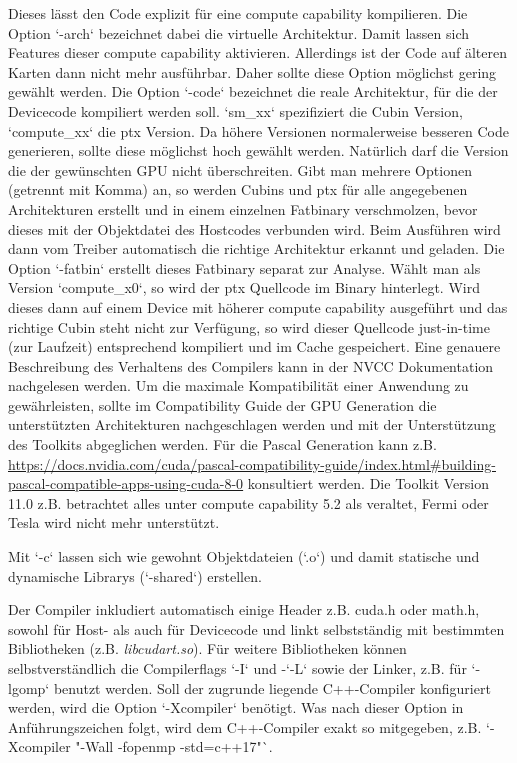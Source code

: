 			Dieses lässt den Code explizit für eine \gls{compute capability} kompilieren. Die Option \li`-arch` bezeichnet dabei die virtuelle Architektur. Damit lassen sich Features dieser \gls{compute capability} aktivieren. Allerdings ist der Code auf älteren Karten dann nicht mehr ausführbar. Daher sollte diese Option möglichst gering gewählt werden. Die Option \li`-code` bezeichnet die reale Architektur, für die der Devicecode kompiliert werden soll. \li`sm_xx` spezifiziert die Cubin Version, \li`compute_xx` die ptx Version. Da höhere Versionen normalerweise besseren Code generieren, sollte diese möglichst hoch gewählt werden. Natürlich darf die Version die der gewünschten GPU nicht überschreiten. Gibt man mehrere Optionen (getrennt mit Komma) an, so werden Cubins und ptx für alle angegebenen Architekturen erstellt und in einem einzelnen Fatbinary verschmolzen, bevor dieses mit der Objektdatei des Hostcodes verbunden wird. Beim Ausführen wird dann vom Treiber automatisch die richtige Architektur erkannt und geladen. Die Option \li`-fatbin` erstellt dieses Fatbinary separat zur Analyse. Wählt man als Version \li`compute_x0`, so wird der ptx Quellcode im Binary hinterlegt. Wird dieses dann auf einem Device mit höherer \gls{compute capability} ausgeführt und das richtige Cubin steht nicht zur Verfügung, so wird dieser Quellcode just-in-time (zur Laufzeit) entsprechend kompiliert und im Cache gespeichert. Eine genauere Beschreibung des Verhaltens des Compilers kann in der NVCC Dokumentation \autocite{cudaNVCC} nachgelesen werden. Um die maximale Kompatibilität einer Anwendung zu gewährleisten, sollte im Compatibility Guide der GPU Generation die unterstützten Architekturen nachgeschlagen werden und mit der Unterstützung des Toolkits abgeglichen werden. Für die Pascal Generation kann z.B. \url{https://docs.nvidia.com/cuda/pascal-compatibility-guide/index.html#building-pascal-compatible-apps-using-cuda-8-0} konsultiert werden. Die Toolkit Version 11.0 z.B. betrachtet alles unter \Gls{compute capability} 5.2 als veraltet, Fermi oder Tesla wird nicht mehr unterstützt.
		
			Mit \li`-c` lassen sich wie gewohnt Objektdateien (\li`.o`) und damit statische und dynamische Librarys (\li`-shared`) erstellen.
		
			Der Compiler inkludiert automatisch einige Header z.B. cuda.h oder math.h, sowohl für Host- als auch für Devicecode und linkt selbstständig mit bestimmten Bibliotheken (z.B. \textit{libcudart.so}). Für weitere Bibliotheken können selbstverständlich die Compilerflags \li`-I` und -\li`-L` sowie der Linker, z.B. für \li`-lgomp` benutzt werden.
			Soll der zugrunde liegende C++-Compiler konfiguriert werden, wird die Option \li`-Xcompiler` benötigt. Was nach dieser Option in Anführungszeichen folgt, wird dem C++-Compiler exakt so mitgegeben, z.B. \li`-Xcompiler "-Wall -fopenmp -std=c++17"`.
		
